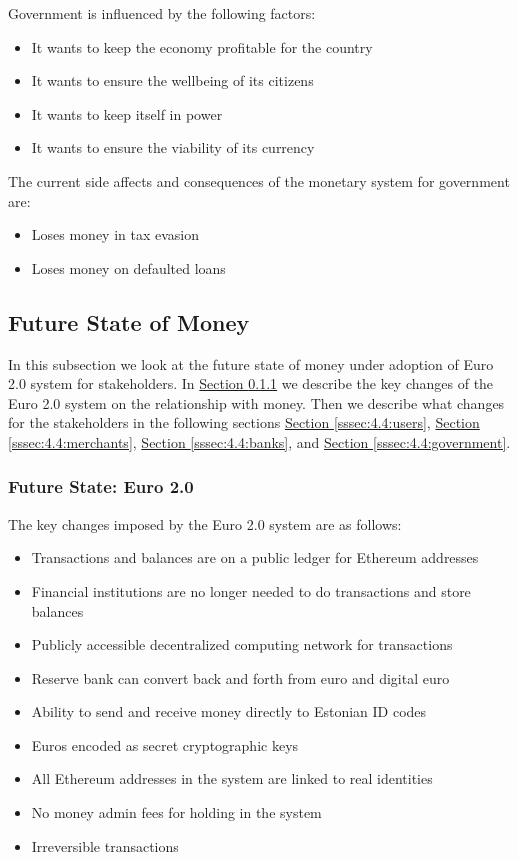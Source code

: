 \documentclass[a4paper,12pt]{article} %
\newcommand{\hypersectionref}[1]{\hyperref[#1]{Section \ref{#1}}}
\begin{document}
{Government is influenced by the following factors:

\begin{itemize}
	\item It wants to keep the economy profitable for the country
	\item It wants to ensure the wellbeing of its citizens
	\item It wants to keep itself in power
	\item It wants to ensure the viability of its currency
\end{itemize}

The current side affects and consequences of the monetary system for government are:

\begin{itemize}
	\item Loses money in tax evasion
	\item Loses money on defaulted loans
\end{itemize}

\subsection{Future State of Money} \label{ssec:4.4}

In this subsection we look at the future state of money under adoption of Euro 2.0 system for stakeholders. In \hypersectionref{sssec:4.4:euro2} we describe the key changes of the Euro 2.0 system on the relationship with money. Then we describe what changes for the stakeholders in the following sections \hypersectionref{sssec:4.4:users}, \hypersectionref{sssec:4.4:merchants}, \hypersectionref{sssec:4.4:banks}, and \hypersectionref{sssec:4.4:government}.

\subsubsection{Future State: Euro 2.0} \label{sssec:4.4:euro2}

The key changes imposed by the Euro 2.0 system are as follows:

\begin{itemize}
	\item Transactions and balances are on a public ledger for Ethereum addresses
	\item Financial institutions are no longer needed to do transactions and store balances
	\item Publicly accessible decentralized computing network for transactions
	\item Reserve bank can convert back and forth from euro and digital euro
	\item Ability to send and receive money directly to Estonian ID codes
	\item Euros encoded as secret cryptographic keys
	\item All Ethereum addresses in the system are linked to real identities
	\item No money admin fees for holding in the system
	\item Irreversible transactions
\end{itemize}

}
\end{document}
